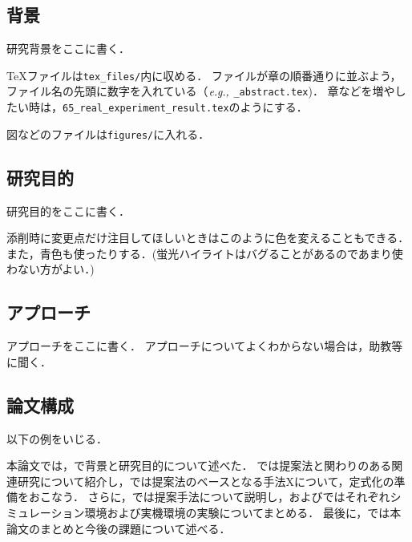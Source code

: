 \subsection{背景}
研究背景をここに書く．

\vspace{10truemm}
\TeX ファイルは\texttt{tex\_files/}内に収める．
ファイルが章の順番通りに並ぶよう，ファイル名の先頭に数字を入れている（$\textit{e.g.,}~$\texttt{{\_}abstract.tex})．
章などを増やしたい時は，\texttt{65\_real\_experiment\_result.tex}のようにする．

図などのファイルは\texttt{figures/}に入れる．

\subsection{研究目的}
研究目的をここに書く．

\vspace{10truemm}
添削時に変更点だけ注目してほしいときは{\red このように色を変えることもできる．}
また，{\blue 青色}も使ったりする．(蛍光ハイライトはバグることがあるのであまり使わない方がよい．)

\subsection{アプローチ}
アプローチをここに書く．
アプローチについてよくわからない場合は，助教等に聞く．

\subsection{論文構成}
以下の例をいじる．\vspace{10truemm}


本論文では，で背景と研究目的について述べた．
では提案法と関わりのある関連研究について紹介し，では提案法のベースとなる手法Xについて，定式化の準備をおこなう．
さらに，では提案手法について説明し，およびではそれぞれシミュレーション環境および実機環境の実験についてまとめる．
最後に，では本論文のまとめと今後の課題について述べる．